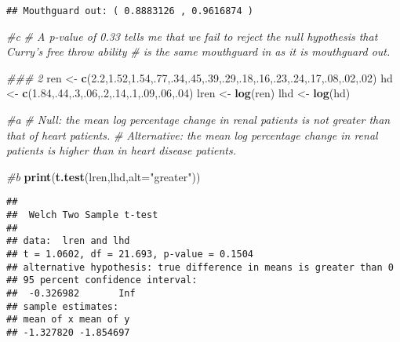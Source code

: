 \documentclass[]{article}
\newenvironment{Shaded}{\begin{snugshade}}{\end{snugshade}}
\newcommand{\CommentTok}[1]{\textcolor[rgb]{0.56,0.35,0.01}{\textit{#1}}}
\newcommand{\DataTypeTok}[1]{\textcolor[rgb]{0.13,0.29,0.53}{#1}}
\newcommand{\DecValTok}[1]{\textcolor[rgb]{0.00,0.00,0.81}{#1}}
\newcommand{\FloatTok}[1]{\textcolor[rgb]{0.00,0.00,0.81}{#1}}
\newcommand{\KeywordTok}[1]{\textcolor[rgb]{0.13,0.29,0.53}{\textbf{#1}}}
\newcommand{\NormalTok}[1]{#1}
\newcommand{\StringTok}[1]{\textcolor[rgb]{0.31,0.60,0.02}{#1}}
\begin{document}
\begin{verbatim}
## Mouthguard out: ( 0.8883126 , 0.9616874 )
\end{verbatim}

\begin{Shaded}
\begin{Highlighting}[]
\CommentTok{#c}
\CommentTok{# A p-value of 0.33 tells me that we fail to reject the null hypothesis that Curry's free throw ability}
\CommentTok{# is the same mouthguard in as it is mouthguard out.}


\CommentTok{### 2}
\NormalTok{ren <-}\StringTok{ }\KeywordTok{c}\NormalTok{(}\FloatTok{2.2}\NormalTok{,}\FloatTok{1.52}\NormalTok{,}\FloatTok{1.54}\NormalTok{,.}\DecValTok{77}\NormalTok{,.}\DecValTok{34}\NormalTok{,.}\DecValTok{45}\NormalTok{,.}\DecValTok{39}\NormalTok{,.}\DecValTok{29}\NormalTok{,.}\DecValTok{18}\NormalTok{,.}\DecValTok{16}\NormalTok{,.}\DecValTok{23}\NormalTok{,.}\DecValTok{24}\NormalTok{,.}\DecValTok{17}\NormalTok{,.}\DecValTok{08}\NormalTok{,.}\DecValTok{02}\NormalTok{,.}\DecValTok{02}\NormalTok{)}
\NormalTok{hd <-}\StringTok{ }\KeywordTok{c}\NormalTok{(}\FloatTok{1.84}\NormalTok{,.}\DecValTok{44}\NormalTok{,.}\DecValTok{3}\NormalTok{,.}\DecValTok{06}\NormalTok{,.}\DecValTok{2}\NormalTok{,.}\DecValTok{14}\NormalTok{,.}\DecValTok{1}\NormalTok{,.}\DecValTok{09}\NormalTok{,.}\DecValTok{06}\NormalTok{,.}\DecValTok{04}\NormalTok{)}
\NormalTok{lren <-}\StringTok{ }\KeywordTok{log}\NormalTok{(ren)}
\NormalTok{lhd <-}\StringTok{ }\KeywordTok{log}\NormalTok{(hd)}

\CommentTok{#a}
\CommentTok{# Null: the mean log percentage change in renal patients is not greater than that of heart patients.}
\CommentTok{# Alternative: the mean log percentage change in renal patients is higher than in heart disease patients.}

\CommentTok{#b}
\KeywordTok{print}\NormalTok{(}\KeywordTok{t.test}\NormalTok{(lren,lhd,}\DataTypeTok{alt=}\StringTok{"greater"}\NormalTok{))}
\end{Highlighting}
\end{Shaded}

\begin{verbatim}
## 
##  Welch Two Sample t-test
## 
## data:  lren and lhd
## t = 1.0602, df = 21.693, p-value = 0.1504
## alternative hypothesis: true difference in means is greater than 0
## 95 percent confidence interval:
##  -0.326982       Inf
## sample estimates:
## mean of x mean of y 
## -1.327820 -1.854697
\end{verbatim}
\end{document}
